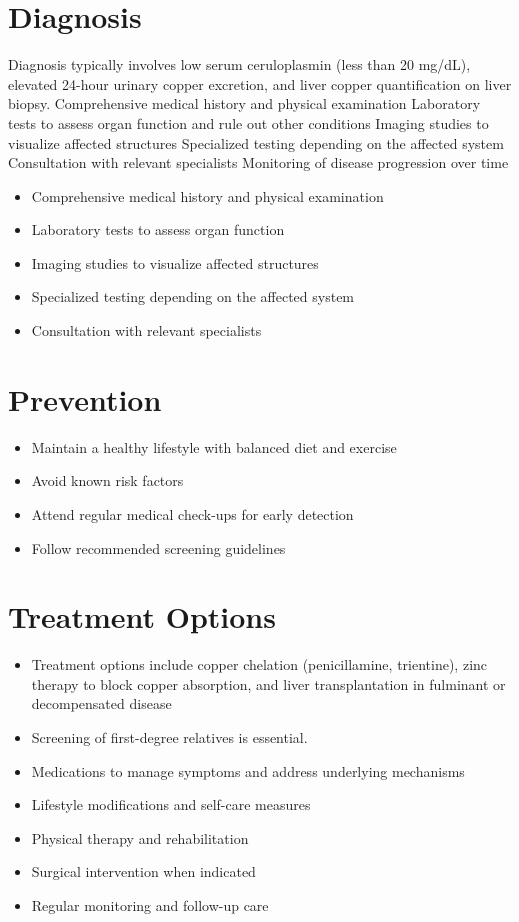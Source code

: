 \section{Diagnosis}
Diagnosis typically involves low serum ceruloplasmin (less than 20 mg/dL), elevated 24-hour urinary copper excretion, and liver copper quantification on liver biopsy. Comprehensive medical history and physical examination Laboratory tests to assess organ function and rule out other conditions Imaging studies to visualize affected structures Specialized testing depending on the affected system Consultation with relevant specialists Monitoring of disease progression over time

\begin{itemize}[noitemsep]
  \item Comprehensive medical history and physical examination
  \item Laboratory tests to assess organ function
  \item Imaging studies to visualize affected structures
  \item Specialized testing depending on the affected system
  \item Consultation with relevant specialists
\end{itemize}
\section{Prevention}
\begin{itemize}[noitemsep]
  \item Maintain a healthy lifestyle with balanced diet and exercise
  \item Avoid known risk factors
  \item Attend regular medical check-ups for early detection
  \item Follow recommended screening guidelines
\end{itemize}
\section{Treatment Options}
\begin{itemize}[noitemsep]
  \item Treatment options include copper chelation (penicillamine, trientine), zinc therapy to block copper absorption, and liver transplantation in fulminant or decompensated disease
  \item Screening of first-degree relatives is essential.
  \item Medications to manage symptoms and address underlying mechanisms
  \item Lifestyle modifications and self-care measures
  \item Physical therapy and rehabilitation
  \item Surgical intervention when indicated
  \item Regular monitoring and follow-up care
\end{itemize}
